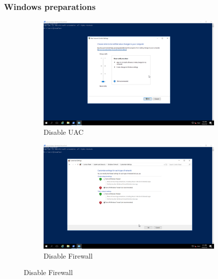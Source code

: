 \subsubsection{Windows preparations}
\begin{figure}[!htb]
    \begin{subfigure}{0.5\textwidth}
        \captionsetup{width=0.8\linewidth}
        \includegraphics[width=0.9\linewidth]{img/Methodologie/Precondition0.png}
        \centering
        \caption{Disable UAC}
    \end{subfigure}
    \begin{subfigure}{0.5\textwidth}
        \captionsetup{width=0.8\linewidth}
        \includegraphics[width=0.9\linewidth]{img/Methodologie/Precondition1.png} 
        \centering
        \caption{Disable Firewall}
    \end{subfigure}
\end{figure}
